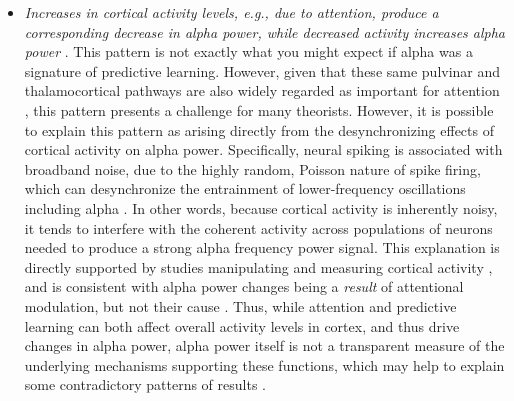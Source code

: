 \documentclass[11pt,twoside]{article}
\newif\myifpdf
\begin{document}
\begin{itemize}
	\item \emph{Increases in cortical activity levels, e.g., due to attention, produce a corresponding decrease in alpha power, while decreased activity increases alpha power}  \citep{WordenFoxeWangEtAl00,KellyLalorReillyEtAl06,KlimeschSausengHanslmayr07,FriesWomelsdorfOostenveldEtAl08,JensenMazaheri10,FosterAwh19}. This pattern is not exactly what you might expect if alpha was a signature of predictive learning.  However, given that these same pulvinar and thalamocortical pathways are also widely regarded as important for attention \citep{LaBergeBuchsbaum90,BenderYouakim01,SnowAllenRafalEtAl09,SaalmannKastner11,ZhouSchaferDesimone16,FiebelkornKastner19}, this pattern presents a challenge for many theorists.  However, it is possible to explain this pattern as arising directly from the desynchronizing effects of cortical activity on alpha power.  Specifically, neural spiking is associated with broadband noise, due to the highly random, Poisson nature of spike firing, which can desynchronize the entrainment of lower-frequency oscillations including alpha \citep{WaldertLemonKraskov13,RayMaunsell11,PrivmanMalachYeshurun13,SolomonKragelSperlingEtAl17}.  In other words, because cortical activity is inherently noisy, it tends to interfere with the coherent activity across populations of neurons needed to produce a strong alpha frequency power signal.  This explanation is directly supported by studies manipulating and measuring cortical activity \citep{ZhouSchaferDesimone16,FriesWomelsdorfOostenveldEtAl08}, and is consistent with alpha power changes being a \emph{result} of attentional modulation, but not their cause \citep{AntonovChakravarthiAndersen20}.  Thus, while attention and predictive learning can both affect overall activity levels in cortex, and thus drive changes in alpha power, alpha power itself is not a transparent measure of the underlying mechanisms supporting these functions, which may help to explain some contradictory patterns of results \citep{FosterAwh19,GundlachMorattiForschackEtAl20,KeitelKeitelBenwellEtAl19}.
	

\end{itemize}
\end{document}
